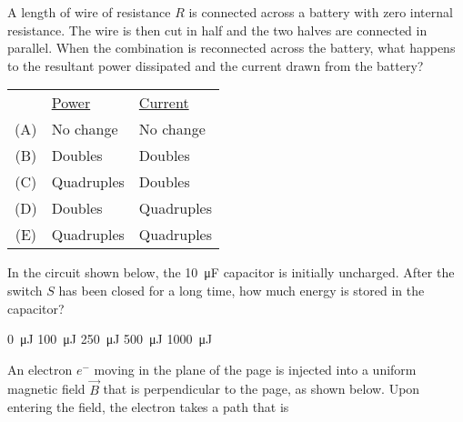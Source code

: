 \documentclass[12pt]{../oss-classkick-exam}
\begin{document}
\begin{questions}
  \uplevel{ \rule{\linewidth}{.5pt}}
    
  \question A length of wire of resistance $R$ is connected across a battery
  with zero internal resistance. The wire is then cut in half and the two
  halves are connected in parallel. When the combination is reconnected across
  the battery, what happens to the resultant power dissipated and the current
  drawn from the battery?

  \begin{tabular}{cll}
    & \underline{Power} & \underline{Current}\\
    (A) & No change  & No change \\
    (B) & Doubles    & Doubles   \\
    (C) & Quadruples & Doubles   \\
    (D) & Doubles    & Quadruples\\
    (E) & Quadruples & Quadruples
  \end{tabular}
  
  \uplevel{\rule{\linewidth}{.5pt}}
  
  \question In the circuit shown below, the \SI{10}{\micro\farad} capacitor is
  initially uncharged. After the switch $S$ has been closed for a long time,
  how much energy is stored in the capacitor?
  
  \begin{minipage}{.4\linewidth}
  \end{minipage}
  \begin{minipage}{.54\linewidth}
    \begin{choices}
      \choice\SI{0}{\micro\joule}
      \choice\SI{100}{\micro\joule}
      \choice\SI{250}{\micro\joule}
      \choice\SI{500}{\micro\joule}
      \choice\SI{1000}{\micro\joule}
    \end{choices}
  \end{minipage}
  \newpage
  
  \question An electron $e^-$ moving in the plane of the page is injected into a
  uniform magnetic field $\vec B$ that is perpendicular to the page, as shown
  below. Upon entering the field, the electron takes a path that is


\end{questions}
\end{document}
